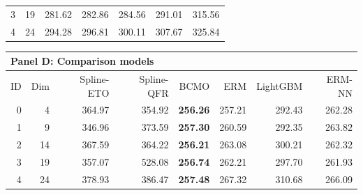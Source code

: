 \begin{table}[htbp]
\begin{tabular}{rrrrrrr}
3 & 19 & 281.62 & 282.86 & 284.56 & 291.01 & 315.56 \\
4 & 24 & 294.28 & 296.81 & 300.11 & 307.67 & 325.84 \\
\bottomrule
\end{tabular}
\par\medskip
\begin{tabular}{rrrrrrrr}
\toprule
\multicolumn{8}{l}{\textbf{Panel D: Comparison models}} \\
\midrule
ID & Dim & Spline-ETO & Spline-QFR & BCMO & ERM & LightGBM & ERM-NN \\
\midrule
0 & 4 & 364.97 & 354.92 & \textbf{256.26} & 257.21 & 292.43 & 262.28 \\
1 & 9 & 346.96 & 373.59 & \textbf{257.30} & 260.59 & 292.35 & 263.82 \\
2 & 14 & 367.59 & 364.22 & \textbf{256.21} & 263.08 & 300.21 & 262.32 \\
3 & 19 & 357.07 & 528.08 & \textbf{256.74} & 262.21 & 297.70 & 261.93 \\
4 & 24 & 378.93 & 386.47 & \textbf{257.48} & 267.32 & 310.68 & 266.09 \\
\bottomrule
\end{tabular}
\end{table}
